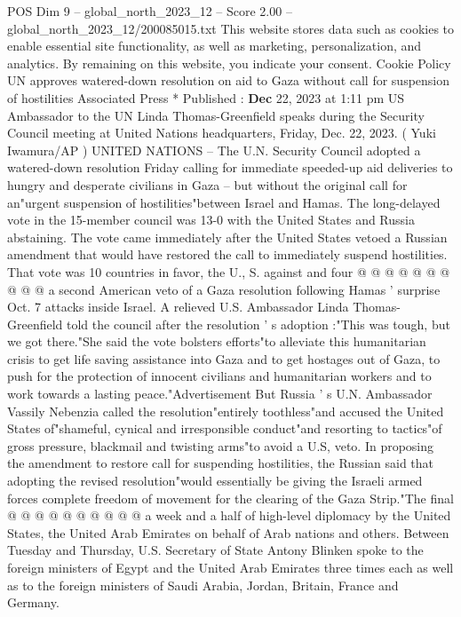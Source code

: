\begin{textsample}{POS Dim 9 – global\_north\_2023\_12 – Score 2.00 – global\_north\_2023\_12/200085015.txt}  \label{ex:f9_pos_165}
This website stores data such as cookies to enable essential site functionality, as well as marketing, personalization, and analytics.
By remaining on this website, you indicate your consent.
Cookie Policy UN approves watered-down resolution on aid to Gaza without call for suspension of hostilities Associated Press * Published : \textbf{Dec} 22, 2023 at 1:11 pm US Ambassador to the UN Linda Thomas-Greenfield speaks during the Security Council meeting at United Nations headquarters, Friday, Dec. 22, 2023. ( Yuki Iwamura/AP ) UNITED NATIONS -- The U.N.
Security Council adopted a watered-down resolution Friday calling for immediate speeded-up aid deliveries to hungry and desperate civilians in Gaza -- but without the original call for an"urgent suspension of hostilities"between Israel and Hamas.
The long-delayed vote in the 15-member council was 13-0 with the United States and Russia abstaining.
The vote came immediately after the United States vetoed a Russian amendment that would have restored the call to immediately suspend hostilities.
That vote was 10 countries in favor, the U., S. against and four @ @ @ @ @ @ @ @ @ @ a second American veto of a Gaza resolution following Hamas ' surprise Oct. 7 attacks inside Israel.
A relieved U.S.
Ambassador Linda Thomas-Greenfield told the council after the resolution ' s adoption :"This was tough, but we got there."She said the vote bolsters efforts"to alleviate this humanitarian crisis to get life saving assistance into Gaza and to get hostages out of Gaza, to push for the protection of innocent civilians and humanitarian workers and to work towards a lasting peace."Advertisement But Russia ' s U.N.
Ambassador Vassily Nebenzia called the resolution"entirely toothless"and accused the United States of"shameful, cynical and irresponsible conduct"and resorting to tactics"of gross pressure, blackmail and twisting arms"to avoid a U.S, veto.
In proposing the amendment to restore call for suspending hostilities, the Russian said that adopting the revised resolution"would essentially be giving the Israeli armed forces complete freedom of movement for the clearing of the Gaza Strip."The final @ @ @ @ @ @ @ @ @ @ a week and a half of high-level diplomacy by the United States, the United Arab Emirates on behalf of Arab nations and others.
Between Tuesday and Thursday, U.S.
Secretary of State Antony Blinken spoke to the foreign ministers of Egypt and the United Arab Emirates three times each as well as to the foreign ministers of Saudi Arabia, Jordan, Britain, France and Germany.

\end{textsample}
